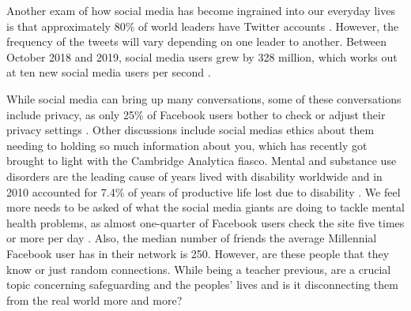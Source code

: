 \documentclass{sigchi}
\begin{document}
	Another exam of how social media has become ingrained into our everyday lives is that approximately 80\% of world leaders have Twitter accounts \cite{47_sm_facts}. However, the frequency of the tweets will vary depending on one leader to another. Between October 2018 and 2019, social media users grew by 328 million, which works out at ten new social media users per second \cite{126_sm_facts}.
	
	While social media can bring up many conversations, some of these conversations include privacy, as only 25\% of Facebook users bother to check or adjust their privacy settings \cite{47_sm_facts}. Other discussions include social medias ethics about them needing to holding so much information about you, which has recently got brought to light with the Cambridge Analytica fiasco. Mental and substance use disorders are the leading cause of years lived with disability worldwide and in 2010 accounted for 7.4\% of years of productive life lost due to disability \cite{gkotsis2017characterisation}. We feel more needs to be asked of what the social media giants are doing to tackle mental health problems, as almost one-quarter of Facebook users check the site five times or more per day \cite{47_sm_facts}. Also, the median number of friends the average Millennial Facebook user has in their network is 250. However, are these people that they know or just random connections. While being a teacher previous, are a crucial topic concerning safeguarding and the peoples' lives and is it disconnecting them from the real world more and more?
\end{document}
